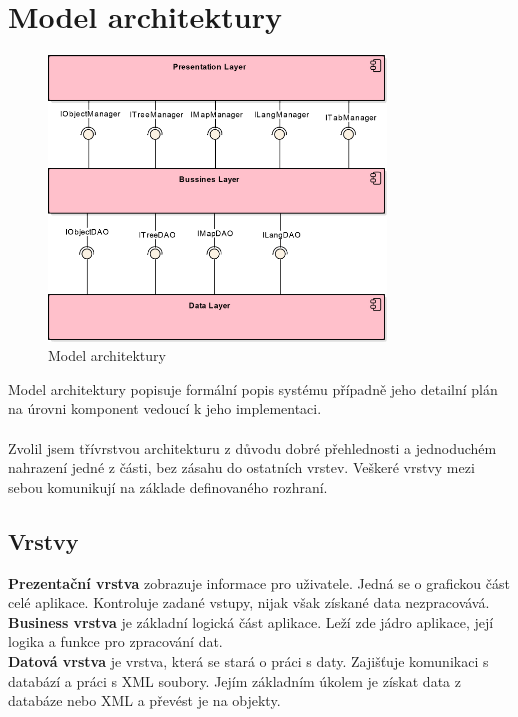\documentclass[thesis=B,czech]{resources/FITthesis}[2012/06/26]
\begin{document}
	\section{Model architektury}
\begin{figure}\centering
	\includegraphics[width=0.8\textwidth]{images/architektura}
	\caption[Model architektury]{Model architektury}\label{fig:architektura}
\end{figure}
Model architektury popisuje formální popis systému případně jeho detailní plán na úrovni komponent vedoucí k jeho implementaci.\\
\\
Zvolil jsem třívrstvou architekturu z důvodu dobré přehlednosti a jednoduchém nahrazení jedné z části, bez zásahu do ostatních vrstev. Veškeré vrstvy mezi sebou komunikují na základe definovaného rozhraní.\\
\subsection{Vrstvy}
\textbf{Prezentační vrstva} zobrazuje informace pro uživatele. Jedná se o grafickou část celé aplikace. Kontroluje zadané vstupy, nijak však získané data nezpracovává.\\
\textbf{Business vrstva} je základní logická část aplikace. Leží zde jádro aplikace, její logika a funkce pro zpracování dat.\\
\textbf{Datová vrstva} je vrstva, která se stará o práci s daty. Zajišťuje komunikaci s databází a práci s XML soubory. Jejím základním úkolem je získat data z databáze nebo XML a převést je na objekty. \\
\end{document}
